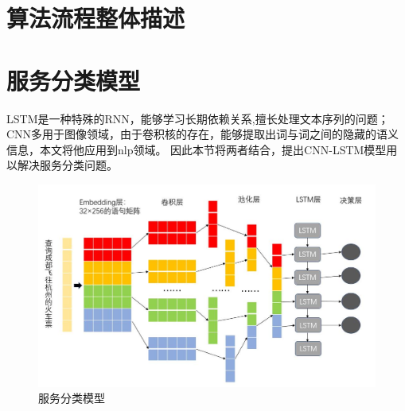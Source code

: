 \section{算法流程整体描述}

\section{服务分类模型}
LSTM是一种特殊的RNN，能够学习长期依赖关系,擅长处理文本序列的问题；CNN多用于图像领域，由于卷积核的存在，能够提取出词与词之间的隐藏的语义信息，本文将他应用到nlp领域。
因此本节将两者结合，提出CNN-LSTM模型用以解决服务分类问题。

\begin{figure}[htbp]
    \centering
    \includegraphics[scale=0.5]{./images/cnn-lstm.jpg}
    \caption{服务分类模型}
    \label{fig:cnn-lstm}
  \end{figure}








